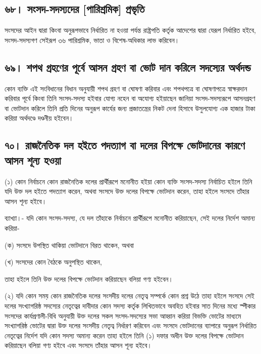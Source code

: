 \documentclass[11pt]{article}
\begin{document}
\subsection{৬৮। সংসদ-সদস্যদের [পারিশ্রমিক] প্রভৃতি}
\label{sec:org91632ad}
সংসদের আইন দ্বারা কিংবা অনুরূপভাবে নির্ধারিত না হওয়া পর্যন্ত রাষ্ট্রপতি কর্তৃক
আদেশের দ্বারা যেরূপ নির্ধারিত হইবে, সংসদ-সদস্যগণ সেইরূপ ৩৬ পারিশ্রমিক, ভাতা
ও বিশেষ-অধিকার লাভ করিবেন।

\subsection{৬৯। শপথ গ্রহণের পূর্বে আসন গ্রহণ বা ভোট দান করিলে সদস্যের অর্থদন্ড}
\label{sec:org10ecc0f}
কোন ব্যক্তি এই সংবিধানের বিধান অনুযায়ী শপথ গ্রহণ বা ঘোষণা করিবার এবং
শপথপত্রে বা ঘোষণাপত্রে স্বাক্ষরদান করিবার পূর্বে কিংবা তিনি সংসদ-সদস্য হইবার
যোগ্য নহেন বা অযোগ্য হইয়াছেন জানিয়া সংসদ-সদস্যরূপে আসনগ্রহণ বা ভোটদান
করিলে তিনি প্রতি দিনের অনুরূপ কার্যের জন্য প্রজাতন্ত্রের নিকট দেনা হিসাবে
উসুলযোগ্য এক হাজার টাকা করিয়া অর্থদণ্ডে দণ্ডনীয় হইবেন।

\subsection{৭০। রাজনৈতিক দল হইতে পদত্যাগ বা দলের বিপক্ষে ভোটদানের কারণে আসন শূন্য হওয়া}
\label{sec:orgb47fb66}
(১) কোন নির্বাচনে কোন রাজনৈতিক দলের প্রার্থীরূপে মনোনীত হইয়া কোন ব্যক্তি
    সংসদ-সদস্য নির্বাচিত হইলে তিনি যদি উক্ত দল হইতে পদত্যাগ করেন, অথবা সংসদে
    উক্ত দলের বিপক্ষে ভোটদান করেন, তাহা হইলে সংসদে তাঁহার আসন শূন্য হইবে।

ব্যাখ্যা।- যদি কোন সংসদ-সদস্য, যে দল তাঁহাকে নির্বাচনে প্রার্থীরূপে মনোনীত
করিয়াছেন, সেই দলের নির্দেশ অমান্য করিয়া-

(ক) সংসদে উপস্থিত থাকিয়া ভোটদানে বিরত থাকেন, অথবা

(খ) সংসদের কোন বৈঠকে অনুপস্থিত থাকেন,

তাহা হইলে তিনি উক্ত দলের বিপক্ষে ভোটদান করিয়াছেন বলিয়া গণ্য হইবেন।

(২) যদি কোন সময় কোন রাজনৈতিক দলের সংসদীয় দলের নেতৃত্ব সম্পর্কে কোন প্রশ্ন
    উঠে তাহা হইলে সংসদে সেই দলের সংখ্যাগরিষ্ঠ সদস্যের নেতৃত্বের দাবীদার কোন
    সদস্য কর্তৃক লিখিতভাবে অবহিত হইবার সাত দিনের মধ্যে স্পীকার সংসদের
    কার্যপ্রণালী-বিধি অনুযায়ী উক্ত দলের সকল সংসদ-সদস্যের সভা আহ্বান করিয়া বিভক্তি
    ভোটের মাধ্যমে সংখ্যাগরিষ্ঠ ভোটের দ্বারা উক্ত দলের সংসদীয় নেতৃত্ব নির্ধারণ
    করিবেন এবং সংসদে ভোটদানের ব্যাপারে অনুরূপ নির্ধারিত নেতৃত্বের নির্দেশ যদি কোন
    সদস্য অমান্য করেন তাহা হইলে তিনি (১) দফার অধীন উক্ত দলের বিপক্ষে ভোটদান
    করিয়াছেন বলিয়া গণ্য হইবে এবং সংসদে তাঁহার আসন শূন্য হইবে।
\end{document}
